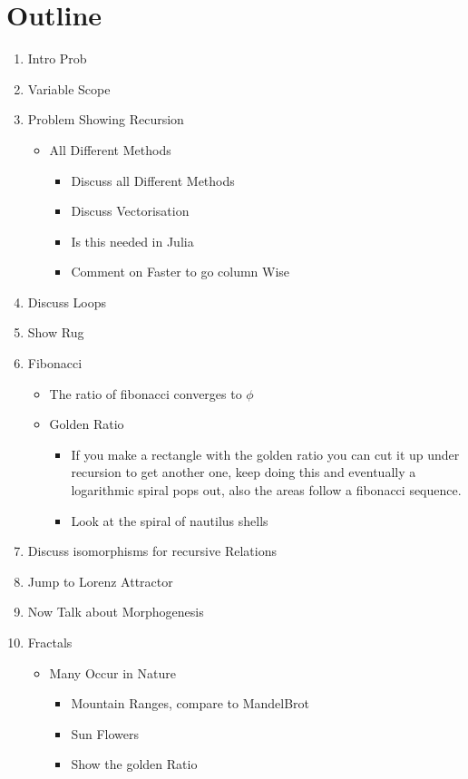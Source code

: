 \documentclass[11pt]{article}
\begin{document}
\section{Outline}
\label{sec:orgce339c9}
\begin{enumerate}
\item Intro Prob
\item Variable Scope
\item Problem Showing Recursion
\begin{itemize}
\item All Different Methods
\begin{itemize}
\item Discuss all Different Methods
\item Discuss Vectorisation
\item Is this needed in Julia
\item Comment on Faster to go column Wise
\end{itemize}
\end{itemize}
\item Discuss Loops
\item Show Rug
\item Fibonacci
\begin{itemize}
\item The ratio of fibonacci converges to \(\phi\)
\item Golden Ratio
\begin{itemize}
\item If you make a rectangle with the golden ratio you can cut it up under
recursion to get another one, keep doing this and eventually a logarithmic
spiral pops out, also the areas follow a fibonacci sequence.
\item Look at the spiral of nautilus shells
\end{itemize}
\end{itemize}
\item Discuss isomorphisms for recursive Relations
\item Jump to Lorenz Attractor
\item Now Talk about Morphogenesis
\item Fractals
\begin{itemize}
\item Many Occur in Nature
\begin{itemize}
\item Mountain Ranges, compare to MandelBrot
\item Sun Flowers
\item Show the golden Ratio
\end{itemize}

\end{itemize}
\end{enumerate}
\end{document}
